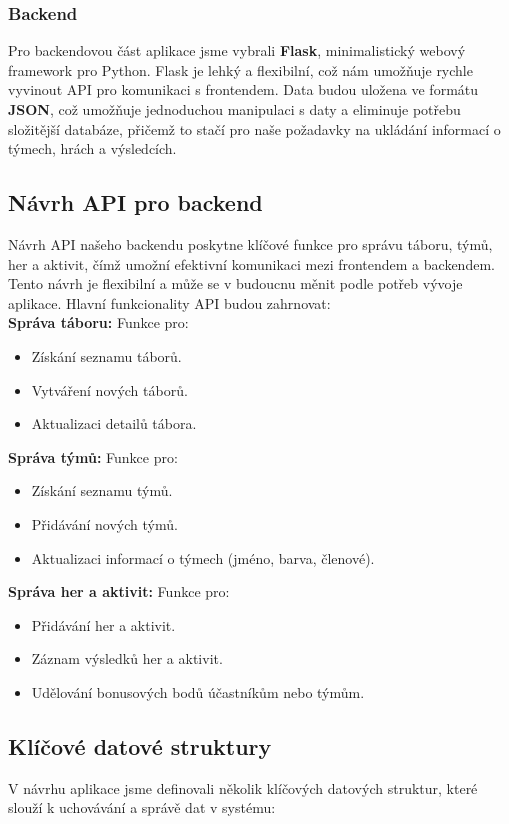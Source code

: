 \documentclass[a4paper, 12pt]{article} %
\begin{document}
\subsubsection{Backend}
Pro backendovou část aplikace jsme vybrali \textbf{Flask}, minimalistický webový framework pro 
Python. Flask je lehký a flexibilní, což nám umožňuje rychle vyvinout API pro komunikaci s 
frontendem. Data budou uložena ve formátu \textbf{JSON}, což umožňuje jednoduchou manipulaci 
s daty a eliminuje potřebu složitější databáze, přičemž to stačí pro naše požadavky na 
ukládání informací o týmech, hrách a výsledcích.

\subsection{Návrh API pro backend}
Návrh API našeho backendu poskytne klíčové funkce pro správu táboru, týmů, her a aktivit, 
čímž umožní efektivní komunikaci mezi frontendem a backendem. Tento návrh je flexibilní a 
může se v budoucnu měnit podle potřeb vývoje aplikace. Hlavní funkcionality API budou zahrnovat: \\

\textbf{Správa táboru:}
Funkce pro:
\begin{itemize}
    \item Získání seznamu táborů.
    \item Vytváření nových táborů.
    \item Aktualizaci detailů tábora.
\end{itemize}

\textbf{Správa týmů:}
Funkce pro:
\begin{itemize}
    \item Získání seznamu týmů.
    \item Přidávání nových týmů.
    \item Aktualizaci informací o týmech (jméno, barva, členové).
\end{itemize}

\textbf{Správa her a aktivit:}
Funkce pro:
\begin{itemize}
    \item Přidávání her a aktivit.
    \item Záznam výsledků her a aktivit.
    \item Udělování bonusových bodů účastníkům nebo týmům.
\end{itemize}

\subsection{Klíčové datové struktury}
V návrhu aplikace jsme definovali několik klíčových datových struktur, které slouží k 
uchovávání a správě dat v systému:
\end{document}
